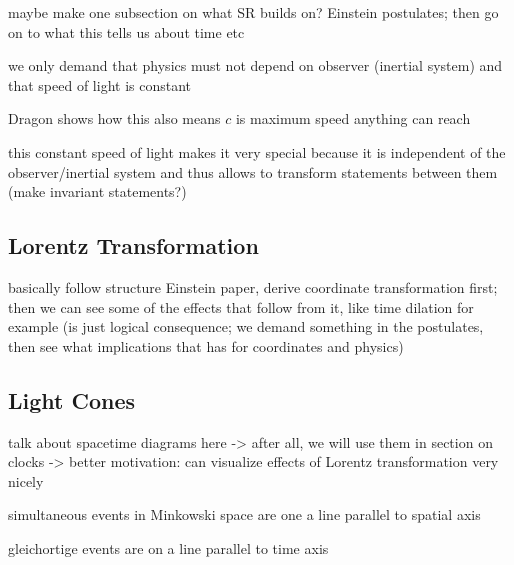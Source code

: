 maybe make one subsection on what SR builds on? Einstein postulates; then go on to what this tells us about time etc

we only demand that physics must not depend on observer (inertial system) and that speed of light is constant


Dragon shows how this also means $c$ is maximum speed anything can reach


this constant speed of light makes it very special because it is independent of the observer/inertial system and thus allows to transform statements between them (make invariant statements?)



		\subsection{Lorentz Transformation}
basically follow structure Einstein paper, derive coordinate transformation first; then we can see some of the effects that follow from it, like time dilation for example (is just logical consequence; we demand something in the postulates, then see what implications that has for coordinates and physics)



		\subsection{Light Cones}
talk about spacetime diagrams here -> after all, we will use them in section on clocks -> better motivation: can visualize effects of Lorentz transformation very nicely


simultaneous events in Minkowski space are one a line parallel to spatial axis

gleichortige events are on a line parallel to time axis



